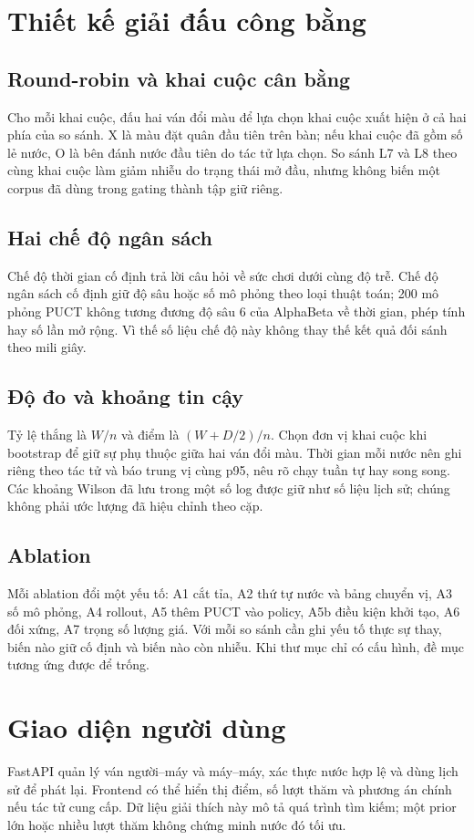 \section{Thiết kế giải đấu công bằng}
\subsection{Round-robin và khai cuộc cân bằng}
Cho mỗi khai cuộc, đấu hai ván đổi màu để lựa chọn khai cuộc xuất hiện ở cả hai phía của so sánh. X là màu đặt quân đầu tiên trên bàn; nếu khai cuộc đã gồm số lẻ nước, O là bên đánh nước đầu tiên do tác tử lựa chọn. So sánh L7 và L8 theo cùng khai cuộc làm giảm nhiễu do trạng thái mở đầu, nhưng không biến một corpus đã dùng trong gating thành tập giữ riêng.
\subsection{Hai chế độ ngân sách}
Chế độ thời gian cố định trả lời câu hỏi về sức chơi dưới cùng độ trễ. Chế độ ngân sách cố định giữ độ sâu hoặc số mô phỏng theo loại thuật toán; 200 mô phỏng PUCT không tương đương độ sâu 6 của AlphaBeta về thời gian, phép tính hay số lần mở rộng. Vì thế số liệu chế độ này không thay thế kết quả đối sánh theo mili giây.
\subsection{Độ đo và khoảng tin cậy}
Tỷ lệ thắng là $W/n$ và điểm là $(W+D/2)/n$. Chọn đơn vị khai cuộc khi bootstrap để giữ sự phụ thuộc giữa hai ván đổi màu. Thời gian mỗi nước nên ghi riêng theo tác tử và báo trung vị cùng p95, nêu rõ chạy tuần tự hay song song. Các khoảng Wilson đã lưu trong một số log được giữ như số liệu lịch sử; chúng không phải ước lượng đã hiệu chỉnh theo cặp.
\subsection{Ablation}
Mỗi ablation đổi một yếu tố: A1 cắt tỉa, A2 thứ tự nước và bảng chuyển vị, A3 số mô phỏng, A4 rollout, A5 thêm PUCT vào policy, A5b điều kiện khởi tạo, A6 đối xứng, A7 trọng số lượng giá. Với mỗi so sánh cần ghi yếu tố thực sự thay, biến nào giữ cố định và biến nào còn nhiễu. Khi thư mục chỉ có cấu hình, đề mục tương ứng được để trống.

\section{Giao diện người dùng}
FastAPI quản lý ván người--máy và máy--máy, xác thực nước hợp lệ và dùng lịch sử để phát lại. Frontend có thể hiển thị điểm, số lượt thăm và phương án chính nếu tác tử cung cấp. Dữ liệu giải thích này mô tả quá trình tìm kiếm; một prior lớn hoặc nhiều lượt thăm không chứng minh nước đó tối ưu.

